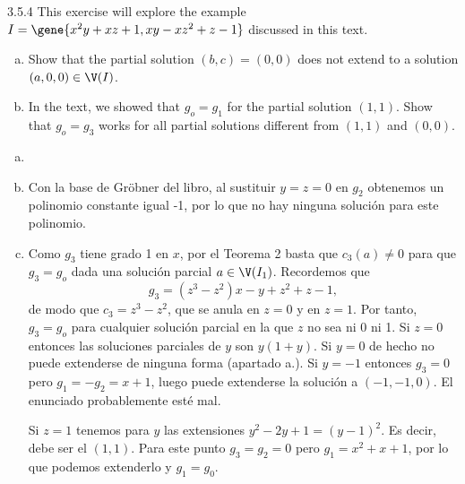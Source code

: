 \documentclass[twoside]{article}
\begin{document}
\begin{ejercicio}{3.5.4}
This exercise will explore the example $I = \gene{x^2y+xz+1, xy-xz^2+z-1}$ discussed in this text.
\begin{enumerate}[a.]
\item Show that the partial solution $(b,c) = (0,0)$ does not extend to a solution $(a,0,0) \in \V(I)$.
\item In the text, we showed that $g_o = g_1$ for the partial solution $(1,1)$.
Show that $g_o = g_3$ works for all partial solutions different from $(1,1)$ and $(0,0)$.
\end{enumerate}
\end{ejercicio}
\begin{solucion}
\begin{enumerate}[a.]
\item[]
\item Con la base de Gröbner del libro, al sustituir $y=z=0$ en $g_2$ obtenemos un polinomio constante igual -1, por lo que no hay ninguna solución para este polinomio. 
\item Como $g_3$ tiene grado 1 en $x$, por el Teorema 2 basta que $c_3(a)\neq 0$ para que $g_3=g_o$ dada una solución parcial $a\in\V(I_1)$. Recordemos que
\[
g_3=(z^3 − z^2)x − y + z^2 + z − 1,
\]
de modo que $c_3=z^3-z^2$, que se anula en $z=0$ y en $z=1$. Por tanto, $g_3=g_o$ para cualquier solución parcial en la que $z$ no sea ni 0 ni 1. Si $z=0$ entonces las soluciones parciales de $y$ son $y(1+y)$. Si $y=0$ de hecho no puede extenderse de ninguna forma (apartado a.). Si $y=-1$ entonces $g_3=0$ pero $g_1=-g_2 = x+1$, luego puede extenderse la solución a $(-1,-1,0)$. El enunciado probablemente esté mal.

Si $z=1$ tenemos para $y$ las extensiones $y^2 -2y+1=(y-1)^2$. Es decir, debe ser el $(1,1)$. Para este punto $g_3 = g_2 = 0$ pero $g_1 = x^2+x+1$, por lo que podemos extenderlo y $g_1=g_0$.
\end{enumerate}
\end{solucion}

\newpage
\end{document}

